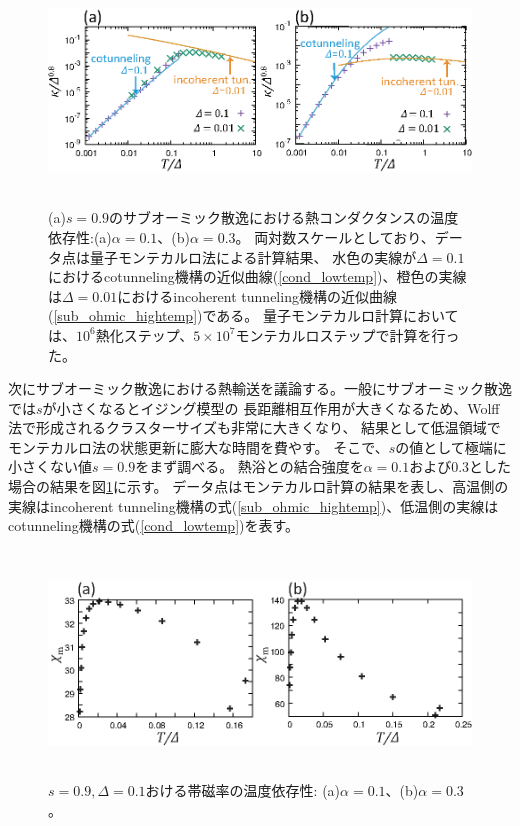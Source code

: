 \begin{figure}[tb]
	\centering
	\includegraphics[height=6.0cm]{conductance_s0.9.eps}
	\caption{
	(a)$s=0.9$のサブオーミック散逸における熱コンダクタンスの温度依存性:(a)$\alpha=0.1$、(b)$\alpha=0.3$。
	両対数スケールとしており、データ点は量子モンテカルロ法による計算結果、
	水色の実線が$\Delta=0.1$におけるcotunneling機構の近似曲線(\ref{cond_lowtemp})、橙色の実線は$\Delta=0.01$におけるincoherent tunneling機構の近似曲線(\ref{sub_ohmic_hightemp})である。
	量子モンテカルロ計算においては、$10^6$熱化ステップ、$5\times10^7$モンテカルロステップで計算を行った。
	}
	\label{fig:conductance_s0.9}
\end{figure}

次にサブオーミック散逸における熱輸送を議論する。一般にサブオーミック散逸では$s$が小さくなるとイジング模型の
長距離相互作用が大きくなるため、Wolff法で形成されるクラスターサイズも非常に大きくなり、
結果として低温領域でモンテカルロ法の状態更新に膨大な時間を費やす。
そこで、$s$の値として極端に小さくない値$s=0.9$をまず調べる。
熱浴との結合強度を$\alpha=0.1$および0.3とした場合の結果を図\ref{fig:conductance_s0.9}に示す。
データ点はモンテカルロ計算の結果を表し、高温側の実線はincoherent tunneling機構の式(\ref{sub_ohmic_hightemp})、低温側の実線は
cotunneling機構の式(\ref{cond_lowtemp})を表す。

\begin{figure}[tb]
	\centering
	\includegraphics[height=6.0cm]{suceptibility_s0.9_delta0.1_alpha0.1-0.3.eps}
	\caption{
		$s=0.9,\Delta=0.1$おける帯磁率の温度依存性: (a)$\alpha=0.1$、(b)$\alpha=0.3$ 。
	}
	\label{fig:suceptibility_s0.9_delta0.1_alpha0.1-0.3}
\end{figure}

